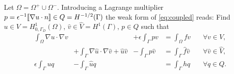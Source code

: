 \documentclass[r]{siamart171218}
\begin{document}
Let $\Omega=\Omega^{+}\cup\Omega^{-}$. Introducing a Lagrange multiplier
$p=\epsilon^{-1}[\![\nabla u \cdot n]\!]\in Q=H^{-1/2}(\Gamma)$
the weak form of \eqref{eq:coupled} reads: Find $u\in V=H^1_{0, \Gamma_D}(\Omega)$,
$\hat{v}\in\hat{V}=H^1(\Gamma)$, $p\in Q$ such that
%
\begin{equation}\label{eq:coupled_weak}
  \begin{aligned}
    &\int_{\Omega}\nabla u\cdot \nabla v &\phantom{+\int_{\Gamma}\nabla \hat{u}\cdot \nabla \hat{v}} &+\epsilon\int_{\Gamma} p v &= \int_{\Omega}f v \quad &\forall v\in V,\\
    &\phantom{\int_{\Omega}\nabla u\cdot \nabla v} &+{\int_{\Gamma}\nabla \hat{u}\cdot \nabla \hat{v} + \hat{u}\hat{v}} &-\int_{\Gamma} p\hat{v} &= \int_{\Gamma}\hat{f}\hat{v} \quad &\forall \hat{v}\in \hat{V},\\
    &\epsilon\int_{\Gamma}u q &-\int_{\Gamma}\hat{u}q &\phantom{-\int{\Gamma}q\hat{v}} &= \int_{\Gamma}h q \quad &\forall q\in Q.
  \end{aligned}
\end{equation}
\end{document}

